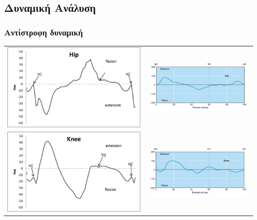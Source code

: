 \documentclass[8pt,sans,mathserif]{beamer}%
\begin{document}
\subsection{Δυναμική Ανάλυση}
\begin{frame}
\frametitle{Αντίστροφη δυναμική}

    \begin{center}
        \begin{tabular}{cc}
            \includegraphics[width=.48\textwidth, height = 0.25\textheight, keepaspectratio]{fig/id-hip.png} & \includegraphics[width=.48\textwidth, height = 0.25\textheight, keepaspectratio]{fig/id-hip-ref.png}\\[3pt]
            \includegraphics[width=.48\textwidth, height = 0.25\textheight, keepaspectratio]{fig/id-knee.png} & \includegraphics[width=.48\textwidth, height = 0.25\textheight, keepaspectratio]{fig/id-knee-ref.png}\\[3pt]

\end{tabular}
\end{center}
\end{frame}
\end{document}

